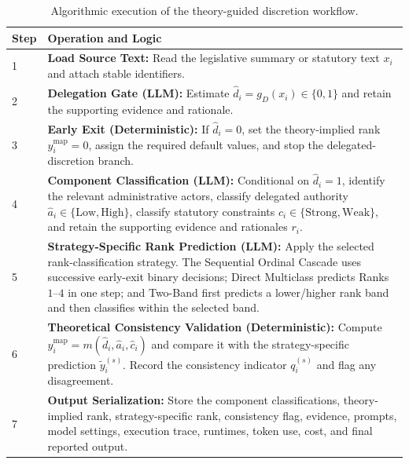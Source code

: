 \documentclass[conference]{IEEEtran}
\begin{document}
\begin{table}[t]
\caption{Algorithmic execution of the theory-guided discretion workflow.}
\label{tab:algorithm}
\centering
\footnotesize
\begin{tabular}{p{}p{}}
\hline
\textbf{Step} & \textbf{Operation and Logic} \\
\hline

1 &
\textbf{Load Source Text:}
Read the legislative summary or statutory text \(x_i\) and attach
stable identifiers. \\

2 &
\textbf{Delegation Gate (LLM):}
Estimate
\(\hat d_i=g_D(x_i)\in\{0,1\}\)
and retain the supporting evidence and rationale. \\

3 &
\textbf{Early Exit (Deterministic):}
If \(\hat d_i=0\), set the theory-implied rank
\(y_i^{\mathrm{map}}=0\), assign the required default values, and stop
the delegated-discretion branch. \\

4 &
\textbf{Component Classification (LLM):}
Conditional on \(\hat d_i=1\), identify the relevant administrative
actors, classify delegated authority
\(\hat a_i\in\{\mathrm{Low},\mathrm{High}\}\), classify statutory
constraints
\(\hat c_i\in\{\mathrm{Strong},\mathrm{Weak}\}\), and retain the
supporting evidence and rationales \(r_i\). \\

5 &
\textbf{Strategy-Specific Rank Prediction (LLM):}
Apply the selected rank-classification strategy. The Sequential
Ordinal Cascade uses
successive early-exit binary decisions; Direct Multiclass predicts
Ranks \(1\)--\(4\) in one step; and Two-Band first predicts a
lower/higher rank band and then classifies within the selected band. \\

6 &
\textbf{Theoretical Consistency Validation (Deterministic):}
Compute
\(y_i^{\mathrm{map}}=m(\hat d_i,\hat a_i,\hat c_i)\)
and compare it with the strategy-specific prediction
\(\tilde y_i^{(s)}\). Record the consistency indicator
\(q_i^{(s)}\) and flag any disagreement. \\

7 &
\textbf{Output Serialization:}
Store the component classifications, theory-implied rank,
strategy-specific rank, consistency flag, evidence, prompts, model
settings, execution trace, runtimes, token use, cost, and final
reported output. \\

\hline
\end{tabular}
\end{table}
\end{document}
